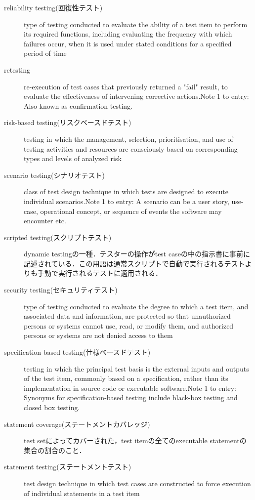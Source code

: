 \begin{description}
    \item[reliability testing(回復性テスト)]type of testing conducted to evaluate the ability of a test item to perform its required functions, including evaluating the frequency with which failures occur, when it is used under stated conditions for a specified period of time
    \item[retesting]re-execution of test cases that previously returned a "fail" result, to evaluate the effectiveness of intervening corrective actions.Note 1 to entry: Also known as confirmation testing.
    \item[risk-based testing(リスクベースドテスト)]testing in which the management, selection, prioritisation, and use of testing activities and resources are consciously based on corresponding types and levels of analyzed risk
    \item[scenario testing(シナリオテスト)]class of test design technique in which tests are designed to execute individual scenarios.Note 1 to entry: A scenario can be a user story, use-case, operational concept, or sequence of events the software may encounter etc.
    \item[scripted testing(スクリプトテスト)]dynamic testingの一種．テスターの操作がtest caseの中の指示書に事前に記述されている．この用語は通常スクリプトで自動で実行されるテストよりも手動で実行されるテストに適用される．
    \item[security testing(セキュリティテスト)]type of testing conducted to evaluate the degree to which a test item, and associated data and information, are protected so that unauthorized persons or systems cannot use, read, or modify them, and authorized persons or systems are not denied access to them
    \item[specification-based testing(仕様ベースドテスト)]testing in which the principal test basis is the external inputs and outputs of the test item, commonly based on a specification, rather than its implementation in source code or executable software.Note 1 to entry: Synonyms for specification-based testing include black-box testing and closed box testing.
    \item[statement coverage(ステートメントカバレッジ)]test setによってカバーされた，test itemの全てのexecutable statementの集合の割合のこと．
    \item[statement testing(ステートメントテスト)]test design technique in which test cases are constructed to force execution of individual statements in a test item

\end{description}
